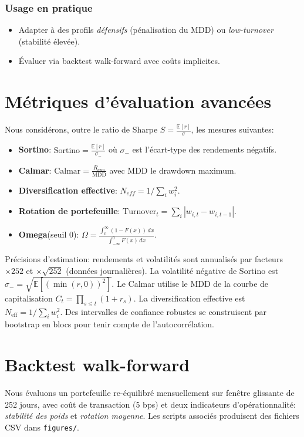 \documentclass[11pt,a4paper]{article}
\begin{document}
\subsubsection*{Usage en pratique}
\begin{itemize}
  \item Adapter à des profils \emph{défensifs} (pénalisation du MDD) ou \emph{low-turnover} (stabilité élevée).
  \item Évaluer via backtest walk-forward avec coûts implicites.
\end{itemize}

\section{Métriques d'évaluation avancées}
Nous considérons, outre le ratio de Sharpe \(S=\frac{\mathbb E[r]}{\sigma}\), les mesures suivantes:
\begin{itemize}
  \item \textbf{Sortino}: \(\text{Sortino}=\frac{\mathbb E[r]}{\sigma_{-}}\) où \(\sigma_{-}\) est l'écart-type des rendements négatifs.
  \item \textbf{Calmar}: \(\text{Calmar}=\frac{R_{ann}}{\text{MDD}}\) avec \(\text{MDD}\) le drawdown maximum.
  \item \textbf{Diversification effective}: \(N_{eff}=1/\sum_i w_i^2\).
  \item \textbf{Rotation de portefeuille}: \(\text{Turnover}_t=\sum_i |w_{i,t}-w_{i,t-1}|\).
  \item \textbf{Omega}(seuil 0): \(\Omega=\frac{\int_0^{\infty}(1-F(x))\,dx}{\int_{-\infty}^0 F(x)\,dx}\).
\end{itemize}
\noindent Précisions d'estimation: rendements et volatilités sont annualisés par facteurs \(\times 252\) et \(\times \sqrt{252}\) (données journalières). La volatilité négative de Sortino est \(\sigma_- = \sqrt{\mathbb E[(\min(r,0))^2]}\). Le Calmar utilise le MDD de la courbe de capitalisation \(C_t=\prod_{s\le t}(1+r_s)\). La diversification effective est \(N_{\text{eff}}=1/\sum_i w_i^2\). Des intervalles de confiance robustes se construisent par bootstrap en blocs pour tenir compte de l'autocorrélation.



\section{Backtest walk-forward}
Nous évaluons un portefeuille re-équilibré mensuellement sur fenêtre glissante de 252 jours, avec coût de transaction (5 bps) et deux indicateurs d'opérationnalité: \emph{stabilité des poids} et \emph{rotation moyenne}. Les scripts associés produisent des fichiers CSV dans \texttt{figures/}.
\end{document}
